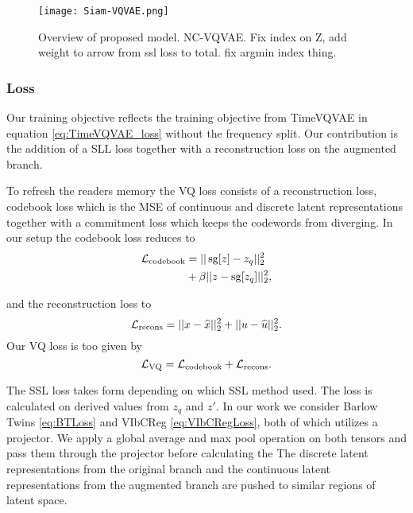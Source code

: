 \documentclass[../../thesis.tex]{subfiles}
\begin{document}
\begin{figure}[h]
    \label{fig:NCVQVAE}
    \texttt{[image: Siam-VQVAE.png]}
    \centering  
    \caption{Overview of proposed model. NC-VQVAE. Fix index on Z, add weight to arrow from ssl loss to total. fix argmin index thing.}
\end{figure}

\subsubsection{Loss}
Our training objective reflects the training objective from TimeVQVAE in equation \ref{eq:TimeVQVAE_loss} without the frequency split. Our contribution is the addition of a SLL loss together with a reconstruction loss on the augmented branch.\newline

To refresh the readers memory the VQ loss consists of a reconstruction loss, codebook loss which is the MSE of continuous and discrete latent representations together with a commitment loss which keeps the codewords from diverging. In our setup the codebook loss reduces to
\begin{equation}
    \label{eq:NCVQVAE_codebook}
    \begin{aligned}
        \mathcal{L}_\text{codebook} &= ||\operatorname{sg}[z] - z_q ||_2^2 \\
                              &+ \beta||z - \operatorname{sg}[z_q]||_2^2,
    \end{aligned}
\end{equation}

and the reconstruction loss to
\begin{equation}
    \label{eq:NCVQVAE_recons}
        \mathcal{L}_\text{recons} = ||x - \widehat{x} ||_2^2 + ||u - \widehat{u}||_2^2.
\end{equation}
\newline
Our VQ loss is too given by
\begin{equation}
    \label{eq:NCVQVAE_loss}
    \mathcal{L}_\text{VQ} = \mathcal{L}_\text{codebook} + \mathcal{L}_\text{recons}.
\end{equation}

The SSL loss takes form depending on which SSL method used. The loss is calculated on derived values from $z_q$ and $z'$. In our work we consider Barlow Twins \ref{eq:BTLoss} and VIbCReg \ref{eq:VIbCRegLoss}, both of which utilizes a projector. We apply a global average and max pool operation on both tensors and pass them through the projector before calculating the 
The discrete latent representations from the original branch and the continuous latent representations from the augmented branch are pushed to similar regions of latent space.
\newline
\end{document}
